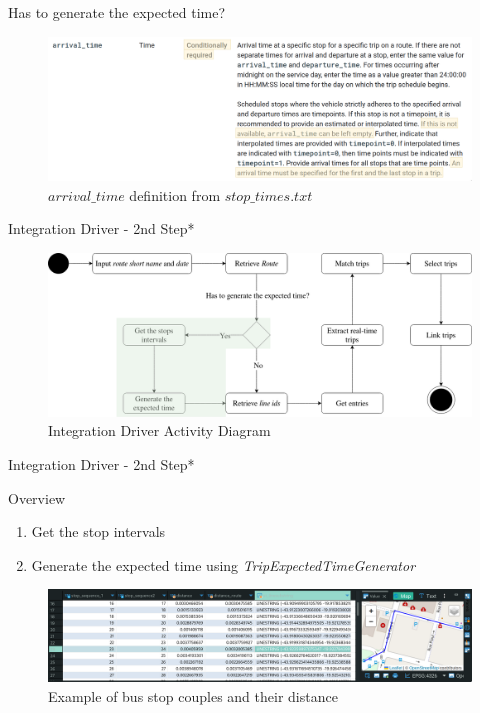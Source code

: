 \documentclass[xcolor=dvipsnames,table]{beamer}
\begin{document}
\begin{frame}{Has to generate the expected time?}
        \begin{figure}[H]
                \centering
                \includegraphics[width = \textwidth]{images/arrival_time_def.png}
                \caption{$arrival\_time$ definition from $stop\_times.txt$}
        \end{figure}
\end{frame}
\begin{frame}{Integration Driver - 2nd Step*}
        \begin{figure}[H]
                \centering
                \includegraphics[width = \textwidth]{images/integrationDriverAD(2nd_step).png}
                \caption{Integration Driver Activity Diagram}
        \end{figure}
\end{frame}

\begin{frame}{Integration Driver - 2nd Step*}
        \begin{block}{Overview}
                \begin{enumerate}
                        \item Get the stop intervals
                        \item Generate the expected time using \textit{TripExpectedTimeGenerator}
                \end{enumerate}
        \end{block}
        \begin{figure}[H]
                \centering
                \includegraphics[width = \textwidth]{images/couplepoints.png}
                \caption{Example of bus stop couples and their distance}
        \end{figure}
\end{frame}
\end{document}

